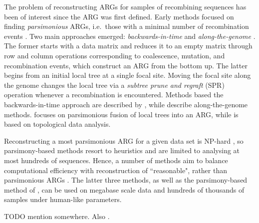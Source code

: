 \documentclass{article}
\begin{document}
The problem of reconstructing ARGs for samples of recombining sequences has
been of interest since the ARG was first defined. Early methods focused on
finding \emph{parsimonious} ARGs, i.e.\ those with a minimal number of
recombination events \citep{hein1990reconstructing}. Two main approaches
emerged: \emph{backwards-in-time} \citep{lyngso2005minimum} and
\emph{along-the-genome} \citep{song2003parsimonious, song2005constructing}. The
former starts with a data matrix and reduces it to an empty matrix through row
and column operations corresponding to coalescence, mutation, and recombination
events, which construct an ARG from the bottom up. The latter begins from an
initial local tree at a single focal site. Moving the focal site along the
genome changes the local tree via a \emph{subtree prune and regraft} (SPR)
operation whenever a recombination is encountered. Methods based the
backwards-in-time approach are described by \citet{song2005efficient,
wu2008association, thao2019hybrid, ignatieva2021kwarg}, while
\citet{hein1993heuristic, wu2011new, mirzaei2017rent} describe along-the-genome
methods. \citet{rasmussen2022espalier} focuses on parsimonious fusion of local
trees into an ARG, while \citet{camara2016inference} is based on topological
data analysis.

Reconstructing a most parsimonious ARG for a given data set is NP-hard
\citep{wang2001perfect}, so parsimony-based methods resort to heuristics and
are limited to analysing at most hundreds of sequences. Hence, a number of
methods aim to balance computational efficiency with reconstruction of
``reasonable", rather than parsimonious ARGs \citep{minichiello2006mapping,
parida2008estimating, kelleher2019inferring,  speidel2019method,
zhang2023biobank}. The latter three methods, as well as the parsimony-based
method of \citet{rasmussen2022espalier}, can be used on megabase scale data and
hundreds of thousands of samples under human-like parameters.

TODO mention \citep{schaefer2021ancestral} somewhere.
Also \citep{kuhner2017consensus}.

\end{document}
